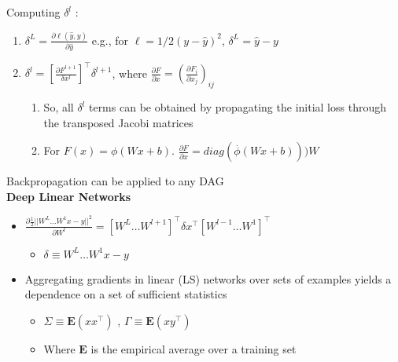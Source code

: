 Computing \(\delta^l\) :
\begin{enumerate}
    \item $\delta^L=\frac{\partial \ell(\hat{y},y)}{\partial \hat{y}}$ e.g., for \(\ell = 1/2(y-\hat{y})^2\), \(\delta^L = \hat{y}-y\) 
    \item \(\delta^l=[\frac{\partial F^{l+1}}{\delta x^l}]^\top\delta^{l+1}\), where \(\frac{\partial F}{\partial x}= (\frac{\partial F_i}{\partial x_j })_{ij}\)
    \begin{enumerate}
        \item So, all $\delta^l$ terms can be obtained by propagating the initial loss through the transposed Jacobi matrices
        \item For $F(x) = \phi(Wx+b)$. \(\frac{\partial F}{\partial x}=  diag(\overset{.}{\phi}(Wx+b)))W\)
    \end{enumerate}

\end{enumerate}
Backpropagation can be applied to any DAG\\
\textbf{Deep Linear Networks}
\begin{itemize}
    \item $\frac{\partial\frac{1}{2}||W^L\dots W^1x-y||^2}{\partial W^l}= [W^L \dots W^{l+1}]^\top\delta x^\top [W^{l-1}\dots W^1]^\top$
    \begin{itemize}
        \item \(\delta \equiv W^L\dots W^1x-y\)
    \end{itemize}
    \item Aggregating gradients in linear (LS) networks over sets of examples yields a dependence on a set of sufficient statistics
    \begin{itemize}
        \item $\Sigma \equiv \mathbf{E}(xx^\top)$ , \(\Gamma \equiv \mathbf{E}(xy^\top)\)
        \item Where \(\mathbf{E}\) is the empirical average over a training set
    \end{itemize}
\end{itemize}

